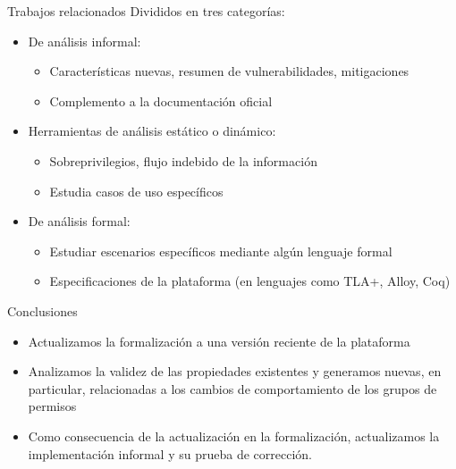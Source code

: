 \documentclass[pdf, handout]{beamer} %
\begin{document}
\begin{frame}{Trabajos relacionados}
    Divididos en tres categorías:
    \pause
    \begin{itemize}[<+->]
        \item De análisis informal:
              \begin{itemize}
                  \item Características nuevas, resumen de vulnerabilidades, mitigaciones
                  \item Complemento a la documentación oficial
              \end{itemize}
        \item Herramientas de análisis estático o dinámico:
              \begin{itemize}
                  \item Sobreprivilegios, flujo indebido de la información
                  \item Estudia casos de uso específicos
              \end{itemize}
        \item De análisis formal:
              \begin{itemize}
                  \item Estudiar escenarios específicos mediante algún lenguaje formal
                  \item Especificaciones de la plataforma (en lenguajes como TLA+, Alloy, Coq)
              \end{itemize}
    \end{itemize}
\end{frame}

\begin{frame}{Conclusiones}
    \begin{itemize}[<+->]
        \item Actualizamos la formalización a una versión reciente de la plataforma
        \item Analizamos la validez de las propiedades existentes y generamos nuevas, en particular,
              relacionadas a los cambios de comportamiento de los grupos de permisos
        \item Como consecuencia de la actualización en la formalización, actualizamos la
              implementación informal  y su prueba de corrección.
    \end{itemize}
\end{frame}
\end{document}
